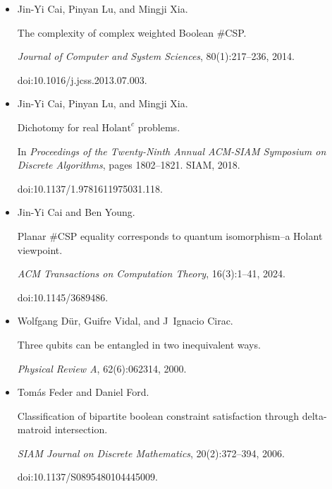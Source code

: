 \documentclass[10pt,a4paper]{article}
\begin{document}
\begin{itemize}
\item[] 
[16]

Jin-Yi Cai, Pinyan Lu, and Mingji Xia.


The complexity of complex weighted Boolean \#CSP.


\emph{Journal of Computer and System Sciences}, 80(1):217–236, 2014.


doi:10.1016/j.jcss.2013.07.003.





\item[] 
[17]

Jin-Yi Cai, Pinyan Lu, and Mingji Xia.


Dichotomy for real $\text{Holant}^{c}$ problems.


In \emph{Proceedings of the Twenty-Ninth Annual ACM-SIAM Symposium on
Discrete Algorithms}, pages 1802–1821. SIAM, 2018.


doi:10.1137/1.9781611975031.118.





\item[] 
[18]

Jin-Yi Cai and Ben Young.


Planar \#CSP equality corresponds to quantum isomorphism–a
Holant viewpoint.


\emph{ACM Transactions on Computation Theory}, 16(3):1–41, 2024.


doi:10.1145/3689486.





\item[] 
[19]

Wolfgang Dür, Guifre Vidal, and J Ignacio Cirac.


Three qubits can be entangled in two inequivalent ways.


\emph{Physical Review A}, 62(6):062314, 2000.





\item[] 
[20]

Tomás Feder and Daniel Ford.


Classification of bipartite boolean constraint satisfaction through
delta-matroid intersection.


\emph{SIAM Journal on Discrete Mathematics}, 20(2):372–394, 2006.


doi:10.1137/S0895480104445009.






\end{itemize}
\end{document}
